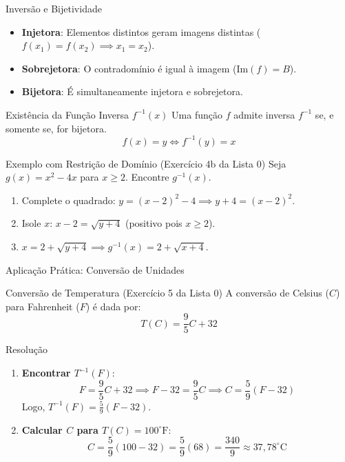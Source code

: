 \documentclass[10pt, aspectratio=169]{beamer}
\begin{document}
\begin{frame}{Inversão e Bijetividade}
    \begin{itemize}
        \item \textbf{Injetora}: Elementos distintos geram imagens distintas ($f(x_1) = f(x_2) \implies x_1 = x_2$).
        \pause
        \item \textbf{Sobrejetora}: O contradomínio é igual à imagem ($\text{Im}(f) = B$).
        \pause
        \item \textbf{Bijetora}: É simultaneamente injetora e sobrejetora.
    \end{itemize}

    \pause
    \begin{block}{Existência da Função Inversa $f^{-1}(x)$}
        Uma função $f$ admite inversa $f^{-1}$ se, e somente se, for bijetora.
        $$f(x) = y \iff f^{-1}(y) = x$$
    \end{block}

    \pause
    \begin{exampleblock}{Exemplo com Restrição de Domínio (Exercício 4b da Lista 0)}
        Seja $g(x) = x^2 - 4x$ para $x \ge 2$. Encontre $g^{-1}(x)$.
        \pause
        \begin{enumerate}
            \item Complete o quadrado: $y = (x - 2)^2 - 4 \implies y + 4 = (x - 2)^2$.
            \pause
            \item Isole $x$: $x - 2 = \sqrt{y + 4}$ (positivo pois $x \ge 2$).
            \pause
            \item $x = 2 + \sqrt{y + 4} \implies g^{-1}(x) = 2 + \sqrt{x + 4}$.
        \end{enumerate}
    \end{exampleblock}
\end{frame}

\begin{frame}{Aplicação Prática: Conversão de Unidades}
    \begin{block}{Conversão de Temperatura (Exercício 5 da Lista 0)}
        A conversão de Celsius ($C$) para Fahrenheit ($F$) é dada por:
        $$T(C) = \frac{9}{5}C + 32$$
    \end{block}

    \pause
    \begin{exampleblock}{Resolução}
        \begin{enumerate}
            \item \textbf{Encontrar $T^{-1}(F)$}:
            $$F = \frac{9}{5}C + 32 \implies F - 32 = \frac{9}{5}C \implies C = \frac{5}{9}(F - 32)$$
            Logo, $T^{-1}(F) = \frac{5}{9}(F - 32)$.

            \pause
            \item \textbf{Calcular $C$ para $T(C) = 100^\circ\text{F}$}:
            $$C = \frac{5}{9}(100 - 32) = \frac{5}{9}(68) = \frac{340}{9} \approx 37{,}78^\circ\text{C}$$
        \end{enumerate}
    \end{exampleblock}
\end{frame}
\end{document}
